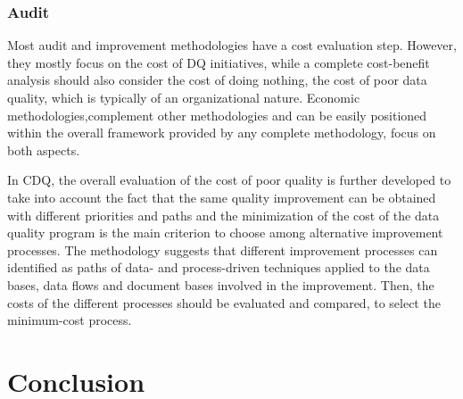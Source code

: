 \documentclass[pdftex,english,oribibl]{llncs}
\begin{document}
\subsubsection{Audit} Most audit and improvement methodologies have a cost evaluation step. However, they mostly focus on the cost of DQ initiatives, while a complete cost-benefit analysis should also consider the cost of doing nothing, the cost of poor data quality, which is typically of an organizational nature. Economic methodologies,complement other methodologies and can be easily positioned within the overall framework provided by any complete methodology, focus on both aspects.

In CDQ, the overall evaluation of the cost of poor quality is further developed to take into account the fact that the same quality improvement can be obtained with different priorities and paths and the minimization of the cost of the data quality program is the main criterion to choose among alternative improvement processes.
The methodology suggests that different improvement processes can identified as paths of data- and process-driven techniques applied to the data bases, data flows and document bases involved in the improvement. Then, the costs of the different processes should be evaluated and compared, to select the minimum-cost process.
\begin{comment}

Experiences of use of early TDQM versions are reported in several U.S.A. Department of Defence (DoD) documents (see US Department of Defense [1994]). Specifically, the use of DQ tools developed over SQL scripts and programming approaches to check data quality are supported.
In Batini and Scannapieco [2006], a large-scale experience of the application of CDQ is reported, referring to the reorganization of Government to Business (G2B) relation- ships in Italy. The interactions with government are needed for several business events, such as starting a new business and evolving a business, which includes variations in legal status, board composition, senior management, and number of employees.
\end{comment}

\section{Conclusion}
\end{document}
